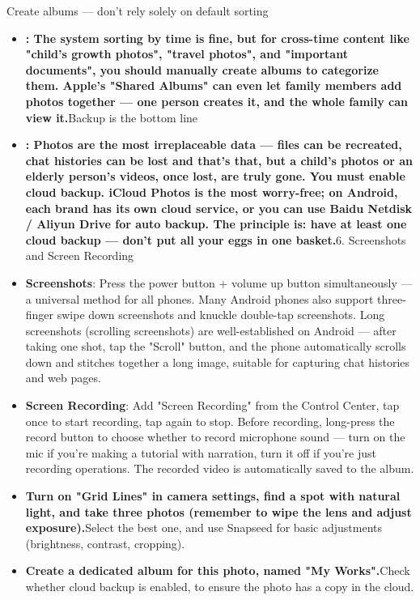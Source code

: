 
Create albums — don't rely solely on default sorting

\begin{itemize}
  \item \textbf{: The system sorting by time is fine, but for cross-time content like "child's growth photos", "travel photos", and "important documents", you should manually create albums to categorize them. Apple's "Shared Albums" can even let family members add photos together — one person creates it, and the whole family can view it.}Backup is the bottom line
  \item \textbf{: Photos are the most irreplaceable data — files can be recreated, chat histories can be lost and that's that, but a child's photos or an elderly person's videos, once lost, are truly gone. You must enable cloud backup. iCloud Photos is the most worry-free; on Android, each brand has its own cloud service, or you can use Baidu Netdisk / Aliyun Drive for auto backup. The principle is: have at least one cloud backup — don't put all your eggs in one basket.}6. Screenshots and Screen Recording
  \item \textbf{Screenshots}: Press the power button + volume up button simultaneously — a universal method for all phones. Many Android phones also support three-finger swipe down screenshots and knuckle double-tap screenshots. Long screenshots (scrolling screenshots) are well-established on Android — after taking one shot, tap the "Scroll" button, and the phone automatically scrolls down and stitches together a long image, suitable for capturing chat histories and web pages.
  \item \textbf{Screen Recording}: Add "Screen Recording" from the Control Center, tap once to start recording, tap again to stop. Before recording, long-press the record button to choose whether to record microphone sound — turn on the mic if you're making a tutorial with narration, turn it off if you're just recording operations. The recorded video is automatically saved to the album.
\end{itemize}


\begin{itemize}
  \item \textbf{Turn on "Grid Lines" in camera settings, find a spot with natural light, and take three photos (remember to wipe the lens and adjust exposure).}Select the best one, and use Snapseed for basic adjustments (brightness, contrast, cropping).
  \item \textbf{Create a dedicated album for this photo, named "My Works".}Check whether cloud backup is enabled, to ensure the photo has a copy in the cloud.
\end{itemize}
